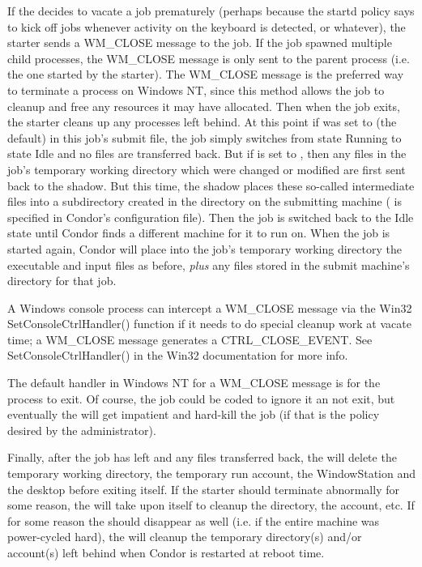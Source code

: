 If the  decides to vacate a job prematurely (perhaps because
the startd policy says to kick off jobs whenever activity on the keyboard is
detected, or whatever), the starter sends a WM\_CLOSE message to the job.
If the job spawned multiple child processes, the WM\_CLOSE message is only
sent to the parent process (i.e. the one started by the starter).  The
WM\_CLOSE message is the preferred way to terminate a process on Windows NT,
since this method allows the job to cleanup and free any resources it may
have allocated.  Then when the job exits, the starter cleans up any
processes left behind.  At this point if  was set to
 (the default) in this job's submit file, the job simply
switches from state Running to state Idle and no files are transferred
back.  But if  is set to , then any files
in the job's temporary working directory which were changed or modified are
first sent back to the shadow.  But this time, the shadow places these
so-called intermediate files into a subdirectory created in the
 directory on the submitting machine ( is specified in Condor's configuration file).  Then the job is switched back to the Idle state until Condor finds a different machine for it to run on.  When the job is started again, Condor will place into the job's temporary working directory the executable and input files as before, \emph{plus} any files stored in the submit machine's  directory for that job.  

\Note A Windows console process can intercept a WM\_CLOSE message
via the Win32 SetConsoleCtrlHandler() function if it needs to do special
cleanup work at vacate time; a WM\_CLOSE message
generates a CTRL\_CLOSE\_EVENT.  See SetConsoleCtrlHandler() in the Win32
documentation for more info.

\Note The default handler in Windows NT for a WM\_CLOSE message is for the
process to exit.  Of course, the job could be coded to ignore it an not
exit, but eventually the  will get impatient and hard-kill
the job (if that is the policy desired by the administrator).

Finally, after the job has left and any files transferred back, the
 will delete the temporary working directory, the temporary
run account, the WindowStation and the desktop before exiting itself.  If
the starter should terminate abnormally for some reason, the 
will take upon itself to cleanup the directory, the account, etc.  If for
some reason the  should disappear as well (i.e. if 
the entire machine was power-cycled hard), the  will cleanup the temporary directory(s) and/or account(s) left behind when Condor is restarted at
reboot time.

